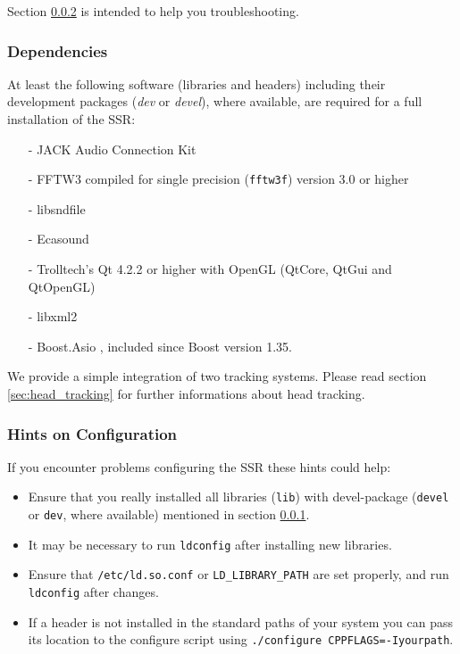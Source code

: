 Section \ref{sec:hints_conf} is intended to help you troubleshooting.

\subsubsection{Dependencies}
\label{sec:dependencies}
At least the following software (libraries and headers) including their
development packages (\emph{dev} or \emph{devel}),
where available, are required for a full installation of the SSR:

\begin{itemize}
\item[-] JACK Audio Connection Kit \cite{jack}
\item[-] FFTW3 compiled for single precision (\texttt{fftw3f}) version 3.0 or higher
  \cite{fftw3}
\item[-] libsndfile \cite{sndfile}
\item[-] Ecasound \cite{ecasound}
\item[-] Trolltech's Qt 4.2.2 or higher with OpenGL (QtCore, QtGui and QtOpenGL)
  \cite{qt4}
\item[-] libxml2 \cite{libxml2}
\item[-] Boost.Asio \cite{boost}, included since Boost version 1.35.
\end{itemize}

We provide a simple integration of two tracking systems.
Please read section
\ref{sec:head_tracking} for further informations about head tracking.

\subsubsection{Hints on Configuration}
\label{sec:hints_conf}

If you encounter problems configuring the SSR these hints could help:
\begin{itemize}
\item Ensure that you really installed all libraries (\verb+lib+) with devel-package (\verb+devel+ or \verb+dev+, where available) mentioned in section \ref{sec:dependencies}.
\item It may be necessary to run \verb+ldconfig+ after installing new libraries.
\item Ensure that \verb+/etc/ld.so.conf+ or \verb+LD_LIBRARY_PATH+ are set
  properly, and run \verb+ldconfig+ after changes.
\item If a header is not installed in the standard paths of your system you
  can pass its location to the configure script using
  \verb+./configure CPPFLAGS=-Iyourpath+.
\end{itemize}

